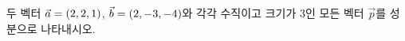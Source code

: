두 벡터 $\vec{a}=(2{,}\mkern3mu\mathopen{}2{,}\mkern3mu\mathopen{}1)$, $\vec{b}=(2{,}\mkern3mu\mathopen{}-3{,}\mkern3mu\mathopen{}-4)$와 각각 수직이고 크기가 $3$인 모든 벡터 $\vec{p}$를 성분으로 나타내시오.
